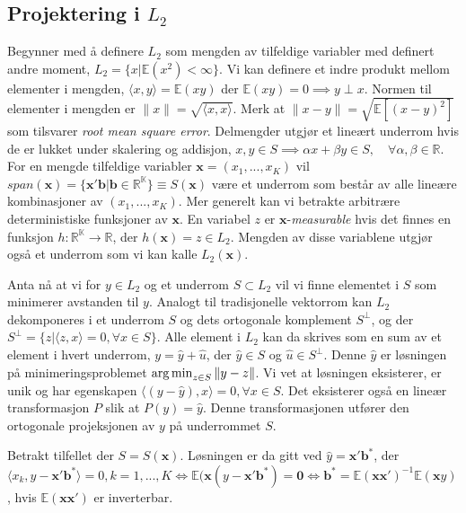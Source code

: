 \subsection{Projektering i $L_2$}
Begynner med å definere $L_2$ som mengden av tilfeldige variabler med definert andre moment, $L_2 = \{x | \mathbb{E}(x^2) < \infty  \}$. Vi kan definere et indre produkt mellom elementer i mengden, $\langle x,y \rangle =  \mathbb{E}(xy)$ der $ \mathbb{E}(xy) = 0 \implies y \perp x. $ Normen til elementer i mengden er $\|{x}\| = \sqrt{\langle x, x \rangle}$. Merk at $\|x-y\| = \sqrt{\mathbb{E}[(x-y)^2]}$ som tilsvarer \textit{root mean square error}. Delmengder utgjør et lineært underrom hvis de er lukket under skalering og addisjon, $x,y \in S \implies \alpha x + \beta y \in S, \quad \forall \alpha, \beta \in \mathbb{R}$. For en mengde tilfeldige variabler $\mathbf{x} = (x_1, ... , x_K)$ vil $span (\mathbf{x}) = \{\mathbf{x}'\mathbf{b} | \mathbf{b} \in \mathbb{R^K}\} \equiv S(\mathbf{x})$ være et underrom som består av alle lineære kombinasjoner av $(x_1, ... , x_K)$. Mer generelt kan vi betrakte arbitrære deterministiske funksjoner av $\mathbf{x}$. En variabel $z$ er $\mathbf{x}$-\textit{measurable} hvis det finnes en funksjon $h: \mathbb{R^K}\rightarrow \mathbb{R}$, der $h(\mathbf{x}) = z \in L_2$. Mengden av disse variablene utgjør også et underrom som vi kan kalle $L_2(\mathbf{x})$.

Anta nå at vi for $y \in L_2$ og et underrom $S \subset L_2$ vil vi finne elementet i $S$ som minimerer avstanden til $y$. Analogt til tradisjonelle vektorrom kan $L_2$ dekomponeres i et underrom $S$ og dets ortogonale komplement $S^{\perp}$, og der $S^{\perp} = \{z | \langle z,x \rangle =0, \forall x \in S\}$. Alle element i $L_2$ kan da skrives som en sum av et element i hvert underrom, $y = \hat{y}+\hat{u}$, der $\hat{y} \in S$ og $\hat{u}\in S^{\perp}$.  Denne $\hat{y}$ er løsningen på minimeringsproblemet $\operatorname*{arg\,min}_{z \in S} \| y-z \|$. Vi vet at løsningen eksisterer, er unik og har egenskapen $\langle (y-\hat{y}), x \rangle = 0, \forall x \in S$. Det eksisterer også en lineær transformasjon $P$ slik at $P(y) = \hat{y}$. Denne transformasjonen utfører den ortogonale projeksjonen av $y$ på underrommet $S$.

Betrakt tilfellet der $S=S(\mathbf{x})$. Løsningen er da gitt ved $\hat{y} = \mathbf{x}'\mathbf{b}^*$, der $\langle x_k, y-\mathbf{x}'\mathbf{b}^* \rangle = 0, k=1,...,K \iff \mathbb{E}(\mathbf{x}(y-\mathbf{x}'\mathbf{b}^*) = \mathbf{0} \iff \mathbf{b}^* = \mathbb{E}( \mathbf{x}\mathbf{x}')^{-1}\mathbb{E}(\mathbf{x}y)$, hvis $\mathbb{E}( \mathbf{x}\mathbf{x}')$ er inverterbar. 

